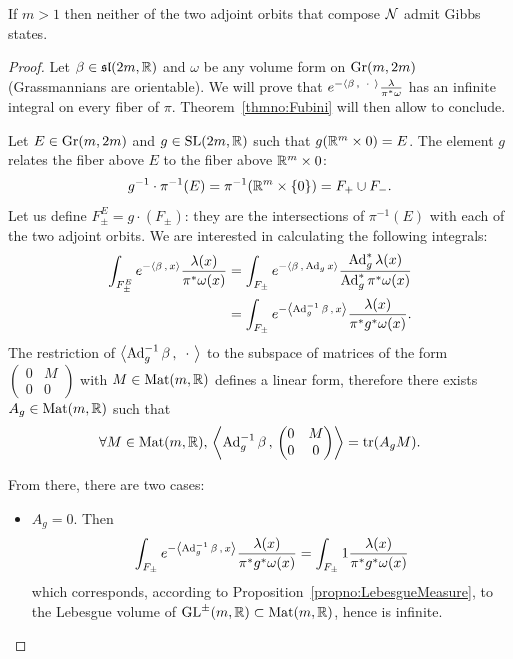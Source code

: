 \documentclass[english]{article}
\begin{document}
\begin{theorem}
	If $m>1$ then neither of the two adjoint orbits that compose $\mathcal{N}$ admit Gibbs states.
\end{theorem}
\begin{proof}
	Let $\beta\in \mathfrak{sl}(2m, \mathbb{R})$ and $\omega$ be any volume form on $\operatorname{Gr}(m,2m)$ (Grassmannians are orientable). We will prove that $e^{-\left\langle \beta \,,\, {\ \cdot \ } \right\rangle} \frac{\lambda}{\pi^*\omega}$ has an infinite integral on every fiber of $\pi$. Theorem~\ref{thmno:Fubini} will then allow to conclude.
	
	Let $E\in \operatorname{Gr}(m,2m)$ and $g\in \operatorname{SL}(2m, \mathbb{R})$ such that $g(\mathbb{R}^m \times 0) = E$.
	The element $g$ relates the fiber above $E$ to the fiber above $\mathbb{R}^m \times 0$:
	\[
		g^{-1}\cdot \pi^{-1}(E) = \pi^{-1}(\mathbb{R}^m\times \{0\}) = F_+ \cup F_-
	.\]
	Let us define $F^E_{\pm} = g\cdot (F_\pm)$: they are the intersections of $\pi^{-1}(E)$ with each of the two adjoint orbits. We are interested in calculating the following integrals:
	\begin{equation*}
	\begin{aligned}
		\int_{F^E_{\pm}} e^{-\left\langle \beta \,,\, x \right\rangle} \frac{\lambda(x)}{\pi^*\omega(x)}
			&= \int_{F_\pm} e^{-\left\langle \beta \,,\, \operatorname{Ad}_g x \right\rangle} \frac{\operatorname{Ad}_g^*\lambda(x)}{\operatorname{Ad}_g^*\pi^*\omega(x)}\\
			&= \int_{F_\pm} 
				e^{-\left\langle \operatorname{Ad}_g^{-1}\beta \,,\, x \right\rangle} 
				\frac{\lambda(x)}{\pi^*g^*\omega(x)}
	.\end{aligned}
	\end{equation*}
	The restriction of $\left\langle \operatorname{Ad}_g^{-1}\beta \,,\, {\ \cdot \ } \right\rangle$ to the subspace of matrices of the form $\begin{pmatrix}
		0 & M\\
		0 & 0
	\end{pmatrix}$
	with $M\in \operatorname{Mat}(m, \mathbb{R})$ defines a linear form, therefore there exists $A_g \in \operatorname{Mat}(m, \mathbb{R})$ such that 
	\[
		\forall M \in \operatorname{Mat}(m, \mathbb{R}), \,
		\left\langle \operatorname{Ad}_g^{-1}\beta \,,\, \begin{pmatrix}
				0 & M\\
				0 & 0
			\end{pmatrix} \right\rangle
			=
		\operatorname{tr}(A_gM)
	.\]
	
	From there, there are two cases:
	\begin{itemize}
	\item $A_g=0$. Then 
	\[
		\int_{F_\pm} 
			e^{-\left\langle \operatorname{Ad}_g^{-1}\beta \,,\, x \right\rangle} 
			\frac{\lambda(x)}{\pi^*g^*\omega(x)}
		= \int_{F_\pm} 
			1 
			\frac{\lambda(x)}{\pi^*g^*\omega(x)}
	\]
	which corresponds, according to Proposition~\ref{propno:LebesgueMeasure}, to the Lebesgue volume of $\operatorname{GL}^\pm(m, \mathbb{R})\subset \operatorname{Mat}(m, \mathbb{R})$, hence is infinite.


\end{itemize}
\end{proof}
\end{document}
